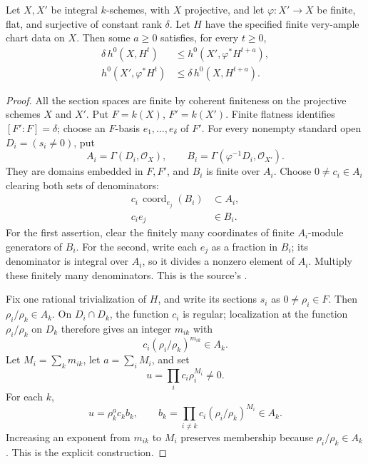 \begin{srlemma}
\label{lem:faithful-finite-flat-section-sandwich}
Let \(X,X'\) be integral \(k\)-schemes, with \(X\) projective,
and let \(\varphi:X'\to X\) be finite, flat, and surjective of
constant rank \(\delta\).
Let \(H\) have the specified finite very-ample chart data on \(X\).
Then some \(a\ge0\) satisfies, for every \(t\ge0\),
\[
 \begin{split}
  \delta\,h^0(X,H^t)
       &\le h^0(X',\varphi^*H^{t+a}),\\
  h^0(X',\varphi^*H^t)
       &\le \delta\,h^0(X,H^{t+a}).
 \end{split}
 \tag{DG2}\label{eq:faithful-finite-flat-sandwich}
\]
\end{srlemma}
\begin{proof}
All the section spaces are finite by coherent finiteness on
the projective schemes \(X\) and \(X'\).
Put \(F=k(X)\), \(F'=k(X')\).  Finite flatness identifies
\([F':F]=\delta\); choose an \(F\)-basis \(e_1,\ldots,e_\delta\)
of \(F'\).
For every nonempty standard open \(D_i=(s_i\ne0)\), put
\[
                 A_i=\Gamma(D_i,\mathcal O_X),\qquad
                 B_i=\Gamma(\varphi^{-1}D_i,\mathcal O_{X'}).
\]
They are domains embedded in \(F,F'\), and \(B_i\) is finite
over \(A_i\).
Choose \(0\ne c_i\in A_i\) clearing both sets of denominators:
\[
 \begin{split}
          c_i\,\operatorname{coord}_{e_j}(B_i)&\subset A_i,\\
                              c_i e_j&\in B_i .
 \end{split}
 \tag{DG3}\label{eq:faithful-chart-denominators}
\]
For the first assertion, clear the finitely many coordinates
of finite \(A_i\)-module generators of \(B_i\).
For the second, write each \(e_j\) as a fraction in \(B_i\);
its denominator is integral over \(A_i\), so it divides a
nonzero element of \(A_i\).
Multiply these finitely many denominators.
This is the source's .

Fix one rational trivialization of \(H\), and write its
sections \(s_i\) as \(0\ne\rho_i\in F\).
Then \(\rho_i/\rho_k\in A_k\).
On \(D_i\cap D_k\), the function \(c_i\) is regular;
localization at the function \(\rho_i/\rho_k\) on \(D_k\)
therefore gives an integer \(m_{ik}\) with
\[
                  c_i(\rho_i/\rho_k)^{m_{ik}}\in A_k.
\]
Let \(M_i=\sum_k m_{ik}\), let \(a=\sum_iM_i\), and set
\[
                           u=\prod_i c_i\rho_i^{M_i}\ne0.
\]
For each \(k\),
\[
 u=\rho_k^a c_k b_k,\qquad
       b_k=\prod_{i\ne k}c_i(\rho_i/\rho_k)^{M_i}\in A_k.
 \tag{DG4}\label{eq:faithful-common-multiple}
\]
Increasing an exponent from \(m_{ik}\) to \(M_i\) preserves
membership because \(\rho_i/\rho_k\in A_k\).
This is the explicit 
construction.


\end{proof}
